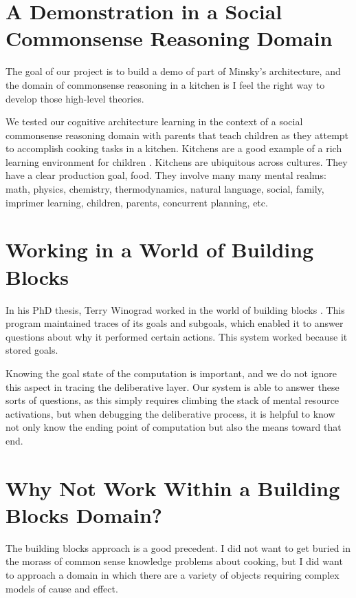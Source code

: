 \section{A Demonstration in a Social Commonsense Reasoning Domain}

The goal of our project is to build a demo of part of Minsky's
architecture, and the domain of commonsense reasoning in a kitchen is
I feel the right way to develop those high-level theories.

We tested our cognitive architecture learning in the context of a
social commonsense reasoning domain with parents that teach children
as they attempt to accomplish cooking tasks in a kitchen.  Kitchens
are a good example of a rich learning environment for children
\citep{dewey:1907}.  Kitchens are ubiquitous across cultures.  They
have a clear production goal, food.  They involve many many mental
realms: math, physics, chemistry, thermodynamics, natural language,
social, family, imprimer learning, children, parents, concurrent
planning, etc.

\section{Working in a World of Building Blocks}

In his PhD thesis, Terry Winograd worked in the world of building
blocks \citep{winograd:1970}.  This program maintained traces of its
goals and subgoals, which enabled it to answer questions about why it
performed certain actions.  This system worked because it stored
goals.

Knowing the goal state of the computation is important, and we do not
ignore this aspect in tracing the deliberative layer.  Our system is
able to answer these sorts of questions, as this simply requires
climbing the stack of mental resource activations, but when debugging
the deliberative process, it is helpful to know not only know the
ending point of computation but also the means toward that end.

\section{Why Not Work Within a Building Blocks Domain?}

The building blocks approach is a good precedent.  I did not want to
get buried in the morass of common sense knowledge problems about
cooking, but I did want to approach a domain in which there are a
variety of objects requiring complex models of cause and effect.

